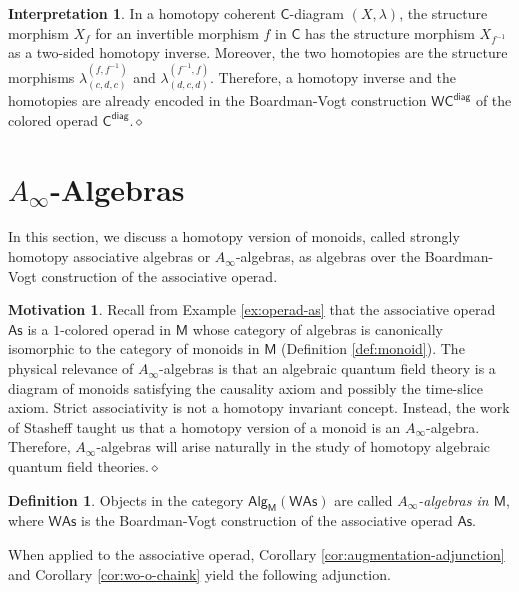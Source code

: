 \documentclass[11pt]{amsbook}
\numberwithin{section}{chapter}
\numberwithin{subsection}{section}
\numberwithin{equation}{section}
\theoremstyle{plain}
\theoremstyle{definition}
\newtheorem{definition}[equation]{Definition}
\newtheorem{interpretation}[equation]{Interpretation}
\newtheorem{motivation}[equation]{Motivation}
\newcommand{\C}{\mathsf{C}}
\newcommand{\M}{\mathsf{M}}
\newcommand{\W}{\mathsf{W}}
\newcommand{\dqed}{\hfill$\diamond$}
\newcommand{\inv}[1]{{#1}^{-1}}
\newcommand{\finverse}{\inv{f}}
\newcommand{\As}{\mathsf{As}}
\newcommand{\Was}{\W\As}
\newcommand{\Cdiag}{\C^{\mathsf{diag}}}
\newcommand{\Wcdiag}{\W\Cdiag}
\newcommand{\alg}{\mathsf{Alg}}
\newcommand{\algm}{\alg_{\M}}
\begin{document}
\begin{interpretation}
In a homotopy coherent $\C$-diagram $(X,\lambda)$, the structure morphism $X_f$ for an invertible morphism $f$ in $\C$ has the structure morphism $X_{\finverse}$ as a two-sided  homotopy inverse.  Moreover, the two homotopies are the structure morphisms $\lambda^{(f,\finverse)}_{(c,d,c)}$ and $\lambda^{(\finverse,f)}_{(d,c,d)}$.  Therefore, a homotopy inverse and the homotopies are already encoded in the Boardman-Vogt construction $\Wcdiag$ of the colored operad $\Cdiag$.\dqed
\end{interpretation}


\section{$A_\infty$-Algebras}\label{sec:ainfinity-algebra}

In this section, we discuss a homotopy version of monoids, called strongly homotopy associative algebras or $A_{\infty}$-algebras, as algebras over the Boardman-Vogt construction of the associative operad.  

\begin{motivation} Recall from Example \ref{ex:operad-as} that the associative operad $\As$ is a $1$-colored operad in $\M$ whose category of algebras is canonically isomorphic to the category of monoids in $\M$ (Definition \ref{def:monoid}).  The physical relevance of $A_\infty$-algebras is that an algebraic quantum field theory is a diagram of monoids satisfying the causality axiom and possibly the time-slice axiom.  Strict associativity is not a homotopy invariant concept.  Instead, the work of Stasheff \cite{stasheff} taught us that a homotopy version of a monoid is an $A_\infty$-algebra.  Therefore, $A_\infty$-algebras will arise naturally in the study of homotopy algebraic quantum field theories.\dqed\end{motivation}

\begin{definition}\label{def:ainfinity-algebra}
Objects in the category $\algm(\Was)$ are called \emph{$A_\infty$-algebras in $\M$}, where $\Was$ is the Boardman-Vogt construction of the associative operad $\As$.
\end{definition}

When applied to the associative operad, Corollary \ref{cor:augmentation-adjunction} and  Corollary \ref{cor:wo-o-chaink} yield the following adjunction.
\end{document}
